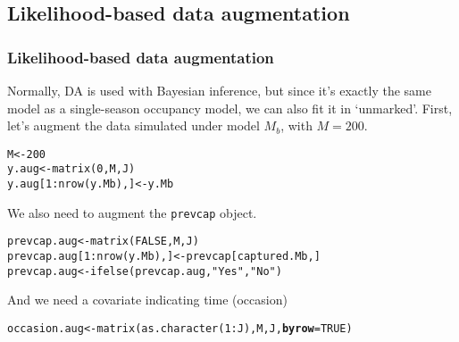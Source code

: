 \documentclass[color=usenames,dvipsnames]{beamer}\usepackage[]{graphicx}\usepackage[]{color}
\makeatletter
\newcommand{\hlnum}[1]{\textcolor[rgb]{0.69,0.494,0}{#1}}%
\newcommand{\hlstr}[1]{\textcolor[rgb]{0.749,0.012,0.012}{#1}}%
\newcommand{\hlopt}[1]{\textcolor[rgb]{0,0,0}{#1}}%
\newcommand{\hlstd}[1]{\textcolor[rgb]{0,0,0}{#1}}%
\newcommand{\hlkwb}[1]{\textcolor[rgb]{0,0.341,0.682}{#1}}%
\newcommand{\hlkwc}[1]{\textcolor[rgb]{0,0,0}{\textbf{#1}}}%
\newcommand{\hlkwd}[1]{\textcolor[rgb]{0.004,0.004,0.506}{#1}}%
\newenvironment{kframe}{%
 \def\at@end@of@kframe{}%
 \ifinner\ifhmode%
  \def\at@end@of@kframe{\end{minipage}}%
  \begin{minipage}{\columnwidth}%
 \fi\fi%
 \def\FrameCommand##1{\hskip\@totalleftmargin \hskip-\fboxsep
 \colorbox{shadecolor}{##1}\hskip-\fboxsep
     \hskip-\linewidth \hskip-\@totalleftmargin \hskip\columnwidth}%
 \MakeFramed {\advance\hsize-\width
   \@totalleftmargin\z@ \linewidth\hsize
   \@setminipage}}%
 {\par\unskip\endMakeFramed%
 \at@end@of@kframe}
\newenvironment{knitrout}{}{} %
\newcommand{\inr}[1]{\colorbox{inlinecolor}{\texttt{#1}}}
\makeatother
\begin{document}
\subsection{Likelihood-based data augmentation}


\begin{frame}[fragile]
  \frametitle{Likelihood-based data augmentation}
  \small
  Normally, DA is used with Bayesian inference, but since it's exactly
  the same model as a single-season occupancy model, we can also fit
  it in `unmarked'.
  \pause
  \vfill
  First, let's augment the data simulated under model $M_b$, with
  $M=200$. 
\begin{knitrout}\scriptsize
{}\color{fgcolor}\begin{kframe}
\begin{alltt}
\hlstd{M} \hlkwb{<-} \hlnum{200}
\hlstd{y.aug} \hlkwb{<-} \hlkwd{matrix}\hlstd{(}\hlnum{0}\hlstd{, M, J)}
\hlstd{y.aug[}\hlnum{1}\hlopt{:}\hlkwd{nrow}\hlstd{(y.Mb),]} \hlkwb{<-} \hlstd{y.Mb}
\end{alltt}
\end{kframe}
\end{knitrout}
\pause
\vfill
We also need to augment the \inr{prevcap} object.
\begin{knitrout}\scriptsize
{}\color{fgcolor}\begin{kframe}
\begin{alltt}
\hlstd{prevcap.aug} \hlkwb{<-} \hlkwd{matrix}\hlstd{(}\hlnum{FALSE}\hlstd{, M, J)}
\hlstd{prevcap.aug[}\hlnum{1}\hlopt{:}\hlkwd{nrow}\hlstd{(y.Mb),]} \hlkwb{<-} \hlstd{prevcap[captured.Mb,]}
\hlstd{prevcap.aug} \hlkwb{<-} \hlkwd{ifelse}\hlstd{(prevcap.aug,} \hlstr{"Yes"}\hlstd{,} \hlstr{"No"}\hlstd{)}
\end{alltt}
\end{kframe}
\end{knitrout}
And we need a covariate indicating time (occasion)
\begin{knitrout}\scriptsize
{}\color{fgcolor}\begin{kframe}
\begin{alltt}
\hlstd{occasion.aug} \hlkwb{<-} \hlkwd{matrix}\hlstd{(}\hlkwd{as.character}\hlstd{(}\hlnum{1}\hlopt{:}\hlstd{J), M, J,} \hlkwc{byrow}\hlstd{=}\hlnum{TRUE}\hlstd{)}
\end{alltt}
\end{kframe}
\end{knitrout}
\end{frame}
\end{document}
